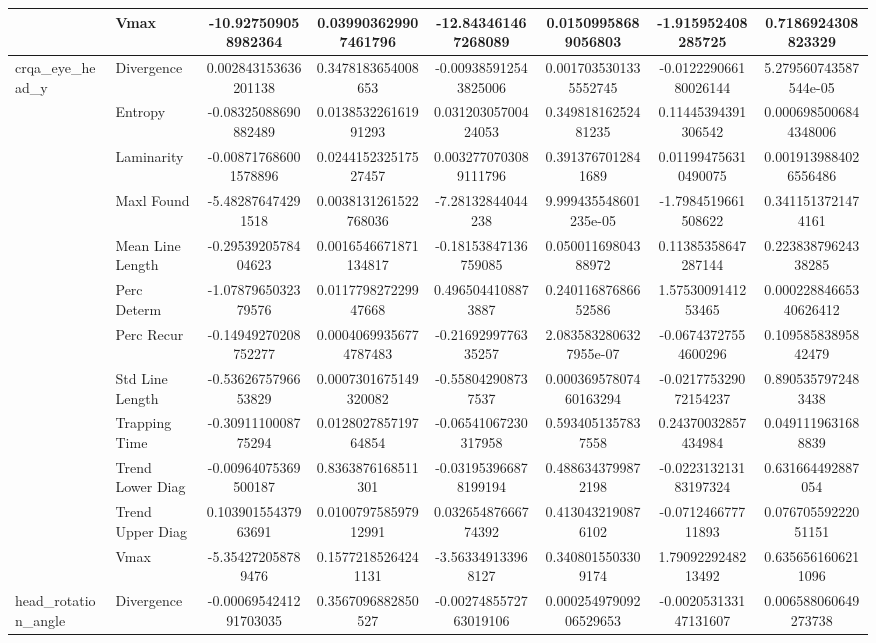 \begin{tabular}{llcc|cc|cc}
 & Vmax & -10.927509058982364 & 0.039903629907461796 & -12.843461467268089 & 0.01509958689056803 & -1.915952408285725 & 0.7186924308823329 \\
\midrule
\multirow{12}{*}{crqa_eye_head_y} & Divergence & 0.002843153636201138 & 0.3478183654008653 & -0.009385912543825006 & 0.0017035301335552745 & -0.012229066180026144 & 5.279560743587544e-05 \\
 & Entropy & -0.08325088690882489 & 0.013853226161991293 & 0.03120305700424053 & 0.34981816252481235 & 0.11445394391306542 & 0.0006985006844348006 \\
 & Laminarity & -0.008717686001578896 & 0.024415232517527457 & 0.0032770703089111796 & 0.3913767012841689 & 0.011994756310490075 & 0.0019139884026556486 \\
 & Maxl Found & -5.482876474291518 & 0.0038131261522768036 & -7.28132844044238 & 9.999435548601235e-05 & -1.7984519661508622 & 0.3411513721474161 \\
 & Mean Line Length & -0.2953920578404623 & 0.0016546671871134817 & -0.18153847136759085 & 0.05001169804388972 & 0.11385358647287144 & 0.22383879624338285 \\
 & Perc Determ & -1.0787965032379576 & 0.011779827229947668 & 0.4965044108873887 & 0.24011687686652586 & 1.5753009141253465 & 0.00022884665340626412 \\
 & Perc Recur & -0.14949270208752277 & 0.00040699356774787483 & -0.2169299776335257 & 2.0835832806327955e-07 & -0.06743727554600296 & 0.10958583895842479 \\
 & Std Line Length & -0.5362675796653829 & 0.0007301675149320082 & -0.558042908737537 & 0.00036957807460163294 & -0.021775329072154237 & 0.8905357972483438 \\
 & Trapping Time & -0.3091110008775294 & 0.012802785719764854 & -0.06541067230317958 & 0.5934051357837558 & 0.24370032857434984 & 0.0491119631688839 \\
 & Trend Lower Diag & -0.00964075369500187 & 0.8363876168511301 & -0.031953966878199194 & 0.4886343799872198 & -0.022313213183197324 & 0.631664492887054 \\
 & Trend Upper Diag & 0.10390155437963691 & 0.010079758597912991 & 0.03265487666774392 & 0.4130432190876102 & -0.071246677711893 & 0.07670559222051151 \\
 & Vmax & -5.354272058789476 & 0.15772185264241131 & -3.563349133968127 & 0.3408015503309174 & 1.7909229248213492 & 0.6356561606211096 \\
\midrule
\multirow{12}{*}{head_rotation_angle} & Divergence & -0.0006954241291703035 & 0.3567096882850527 & -0.0027485572763019106 & 0.00025497909206529653 & -0.002053133147131607 & 0.006588060649273738 \\

\end{tabular}
